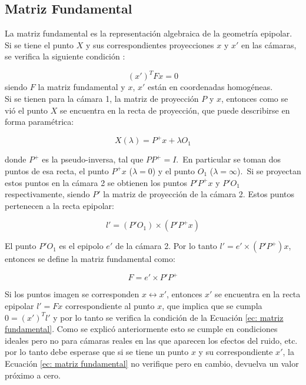 \subsection{Matriz Fundamental}

La matriz fundamental es la representación algebraica de la geometría epipolar. Si se tiene el punto $X$ y sus correspondientes proyecciones $x$ y $x'$ en las cámaras, se verifica la siguiente condición :

\begin{equation}
(x')^T F x = 0
\label{ec: matriz fundamental}
\end{equation}
siendo  $F$ la matriz fundamental y $x$, $x'$ están en coordenadas homogéneas.\\

Si se tienen para la cámara 1, la matriz de proyección $P$ y $x$, entonces como se vió el punto $X$ se encuentra en la recta de proyección, que puede describirse en forma paramétrica:

\begin{equation}
	X(\lambda) = P^+x+\lambda O_1
\end{equation}

donde $P^+$ es la pseudo-inversa, tal que $PP^+=I$.\
En particular se toman dos puntos de esa recta, el punto $P^+x$ ($\lambda = 0$) y el punto $O_1$ ($\lambda = \infty$).\
Si se proyectan estos puntos en la cámara 2 se obtienen los puntos $P'P^+x$ y $P'O_1$ respectivamente, siendo $P'$ la matriz de proyección de la cámara 2. Estos puntos pertenecen a la recta epipolar:

\begin{equation}
l' = (P'O_1) \times (P'P^+ x)
\end{equation}

El punto $P'O_1$ es el epipolo $e'$ de la cámara 2. Por lo tanto $l' = e' \times (P'P^+) x$, entonces se define la matriz fundamental como:

\begin{equation}
F=e' \times P'P^+
\end{equation}

Si los puntos imagen se corresponden $x \leftrightarrow x'$, entonces $x'$ se encuentra en la recta epipolar $l'=Fx$ correspondiente al punto $x$, que implica que se cumpla $0=(x')^Tl'$ y por lo tanto se verifica la condición de la Ecuación \ref{ec: matriz fundamental}. Como se explicó anteriormente esto se cumple en condiciones ideales pero no para cámaras reales en las que aparecen los efectos del ruido, etc. por lo tanto debe esperase que si se tiene un punto $x$ y su correspondiente $x'$, la Ecuación \ref{ec: matriz fundamental} no verifique pero en cambio, devuelva un valor próximo a cero.\\

